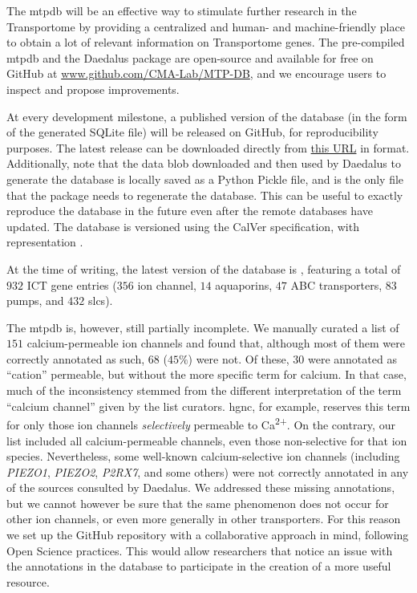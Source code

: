 The \gls{mtpdb} will be an effective way to stimulate further research in the Transportome by providing a centralized and human- and machine-friendly place to obtain a lot of relevant information on Transportome genes.
The pre-compiled \gls{mtpdb} and the Daedalus package are open-source and available for free on GitHub at \href{https://github.com/CMA-Lab/MTP-DB/}{www.github.com/CMA-Lab/MTP-DB}, and we encourage users to inspect and propose improvements.

At every development milestone, a published version of the database (in the form of the generated SQLite file) will be released on GitHub, for reproducibility purposes.
The latest release can be downloaded directly from \href{https://github.com/CMA-Lab/MTP-DB/releases/latest/download/MTPDB.sqlite.gz}{this URL} in  format.
Additionally, note that the data blob downloaded and then used by Daedalus to generate the database is locally saved as a Python Pickle file, and is the only file that the package needs to regenerate the database.
This can be useful to exactly reproduce the database in the future even after the remote databases have updated.
The database is versioned using the CalVer specification, with representation .

At the time of writing, the latest version of the database is , featuring a total of $932$ ICT gene entries ($356$ ion channel, $14$ aquaporins, $47$ ABC transporters, $83$ pumps, and $432$ \glspl{slc}). 

The \gls{mtpdb} is, however, still partially incomplete.
We manually curated a list of $151$ calcium-permeable ion channels and found that, although most of them were correctly annotated as such, $68$ ($45\%$) were not.
Of these, $30$ were annotated as ``cation'' permeable, but without the more specific term for calcium.
In that case, much of the inconsistency stemmed from the different interpretation of the term ``calcium channel'' given by the list curators.
\gls{hgnc}, for example, reserves this term for only those ion channels \textit{selectively} permeable to Ca\textsuperscript{2+}.
On the contrary, our list included all calcium-permeable channels, even those non-selective for that ion species.
Nevertheless, some well-known calcium-selective ion channels (including \textit{PIEZO1}, \textit{PIEZO2}, \textit{P2RX7}, and some others) were not correctly annotated in any of the sources consulted by Daedalus.
We addressed these missing annotations, but we cannot however be sure that the same phenomenon does not occur for other ion channels, or even more generally  in other transporters.
For this reason we set up the GitHub repository with a collaborative approach
in mind, following Open Science practices.
This would allow researchers that notice an issue with the annotations in the database to participate in the creation of a more useful resource.

